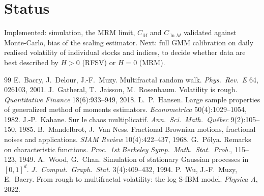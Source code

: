 \documentclass[10pt,twocolumn]{article}
\begin{document}
\section{Status}
Implemented: simulation, the MRM limit, $C_M$ and $C_{\ln M}$ validated against Monte-Carlo, bias of the scaling estimator. Next: full GMM calibration on daily realised volatility of individual stocks and indices, to decide whether data are best described by $H>0$ (RFSV) or $H=0$ (MRM).

\footnotesize
\begin{thebibliography}{99}\setlength{\itemsep}{0pt}
 E.~Bacry, J.~Delour, J.-F.~Muzy. Multifractal random walk. \emph{Phys.\ Rev.\ E} 64, 026103, 2001.
 J.~Gatheral, T.~Jaisson, M.~Rosenbaum. Volatility is rough. \emph{Quantitative Finance} 18(6):933--949, 2018.
 L.~P.~Hansen. Large sample properties of generalized method of moments estimators. \emph{Econometrica} 50(4):1029--1054, 1982.
 J.-P.~Kahane. Sur le chaos multiplicatif. \emph{Ann.\ Sci.\ Math.\ Qu\'ebec} 9(2):105--150, 1985.
 B.~Mandelbrot, J.~Van Ness. Fractional Brownian motions, fractional noises and applications. \emph{SIAM Review} 10(4):422--437, 1968.
 G.~P\'olya. Remarks on characteristic functions. \emph{Proc.\ 1st Berkeley Symp.\ Math.\ Stat.\ Prob.}, 115--123, 1949.
 A.~Wood, G.~Chan. Simulation of stationary Gaussian processes in $[0,1]^d$. \emph{J.\ Comput.\ Graph.\ Stat.} 3(4):409--432, 1994.
 P.~Wu, J.-F.~Muzy, E.~Bacry. From rough to multifractal volatility: the log S-fBM model. \emph{Physica A}, 2022.
\end{thebibliography}
\end{document}

